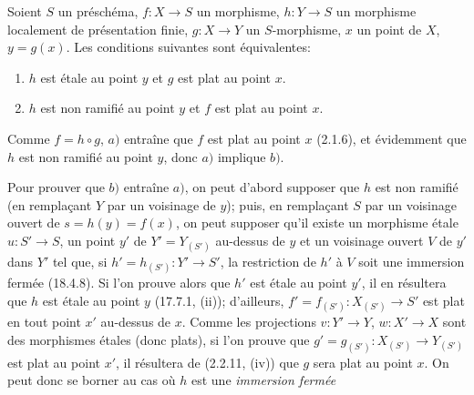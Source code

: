 \begin{proposition}[18.4.9]
\label{IV.18.4.9}
Soient $S$ un préschéma, $f:X\to S$ un morphisme, $h:Y\to S$ un morphisme localement de présentation finie, $g:X\to Y$ un $S$-morphisme, $x$ un point de $X$, $y=g(x)$. Les conditions suivantes sont équivalentes:
\begin{enumerate}
  \item[a)] $h$ est étale au point $y$ et $g$ est plat au point $x$.
  \item[b)] $h$ est non ramifié au point $y$ et $f$ est plat au point $x$.
\end{enumerate}
\end{proposition}

Comme $f=h\circ g$, $a)$ entraîne que $f$ est plat au point $x$ (2.1.6), et évidemment que $h$ est non ramifié au point $y$, donc $a)$ implique $b)$.

Pour prouver que $b)$ entraîne $a)$, on peut d'abord supposer que $h$ est non ramifié (en remplaçant $Y$ par un voisinage de $y$); puis, en remplaçant $S$ par un voisinage ouvert de $s=h(y)=f(x)$, on peut supposer qu'il existe un morphisme étale $u:S'\to S$, un point $y'$ de $Y'=Y_{(S')}$ au-dessus de $y$ et un voisinage ouvert $V$ de $y'$ dans $Y'$ tel que, si $h'=h_{(S')}:Y'\to S'$, la restriction de $h'$ à $V$ soit une immersion fermée (18.4.8). Si l'on prouve alors que $h'$ est étale au point $y'$, il en résultera que $h$ est étale au point $y$ (17.7.1, (ii)); d'ailleurs, $f'=f_{(S')}:X_{(S')}\to S'$ est plat en tout point $x'$ au-dessus de $x$. Comme les projections $v:Y'\to Y$, $w:X'\to X$ sont des morphismes étales (donc plats), si l'on prouve que $g'=g_{(S')}:X_{(S')}\to Y_{(S')}$ est plat au point $x'$, il résultera de (2.2.11, (iv)) que $g$ sera plat au point $x$. On peut donc se borner au cas où $h$ est une \emph{immersion fermée}

